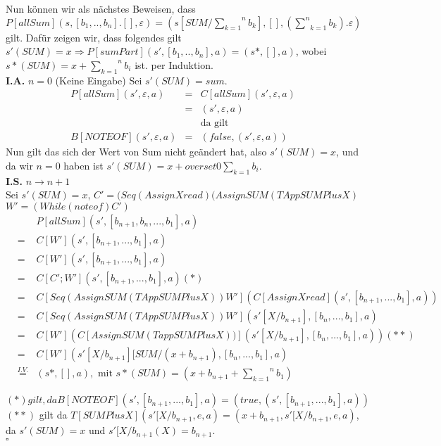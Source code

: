 \documentclass[11pt,a4paper,ngerman]{article}
\begin{document}
Nun können wir als nächstes Beweisen, dass
$P[allSum](s,[b_1,..,b_n].[],\varepsilon) = (s[SUM/\overset{n}{\underset{k=1}{\sum}}b_k],[],(\underset{k=1}{\overset{n}{\sum}} b_k).\varepsilon)$
gilt. Dafür zeigen wir, dass folgendes gilt
$s'(SUM) = x \Rightarrow P[sumPart](s',[b_1,..,b_n],a) = (s*, [], a)$, wobei $s*(SUM) = x + \overset{n}{\underset{k=1}{\sum}} b_i$ ist.
per Induktion.\\
\textbf{I.A.} $n=0$ (Keine Eingabe)
Sei $s'(SUM) = sum$.
$$\begin{array}{rcl}
    P[allSum](s',\varepsilon,a) &=& C[allSum](s',\varepsilon,a)\\
    &=& (s',\varepsilon,a)\\
&&\text{da gilt}\\
B[NOT EOF](s',\varepsilon,a) &=& (false,(s',\varepsilon,a)) 
\end{array}$$
Nun gilt das sich der Wert von Sum nicht geändert hat, also $s'(SUM) = x$, und da wir $n=0$ haben ist
$s'(SUM) = x + overset{0}{\underset{k=1}{\sum}} b_i$.\\

\textbf{I.S.} $n \rightarrow n+1$\\
Sei $s'(SUM) = x$,
$C' = (Seq (Assign X read) (Assign SUM (TApp SUM Plus X)$
$W' = (While (not eof) C')$
$$\begin{array}{rcl}
    &&P[allSum](s',[b_{n+1},b_n,...,b_1],a) \\
    &=& C[W'](s',[b_{n+1},...,b_1],a)\\
    &=& C[W'](s',[b_{n+1},...,b_1],a)\\
    &=& C[C';W'](s',[b_{n+1},...,b_1],a) (*)\\
    &=& C[Seq (Assign SUM (TApp SUM Plus X)) W'](C[Assign X read](s',[b_{n+1},...,b_1],a))\\
    &=& C[Seq (Assign SUM (TApp SUM Plus X)) W'](s'[X/b_{n+1}],[b_n,...,b_1],a)\\
    &=& C[W'] (C[Assign SUM (Tapp SUM Plus X))](s'[X/b_{n+1}],[b_n,...,b_1],a)) (**)\\
    &=& C[W'] (s'[X/b_{n+1}][SUM/(x+b_{n+1}),[b_n,...,b_1],a)\\
    &\stackrel{I.V.}{=}& (s*,[],a), \text{ mit }s*(SUM) = (x+b_{n+1} + \overset{n}{\underset{k=1}{\sum}} b_1)
\end{array}$$

$(*) gilt, da B[NOT EOF](s',[b_{n+1},...,b_1],a) = (true, (s',[b_{n+1},...,b_1],a))$\\
$(**)$ gilt da $T[SUM Plus X](s'[X/b_{n+1},e,a) = (x+b_{n+1},s'[X/b_{n+1},e,a)$, da $s'(SUM) = x$ und $s'[X/b_{n+1}(X) = b_{n+1}$.\\
\mbox{} \hfill $\square$
\end{document}
